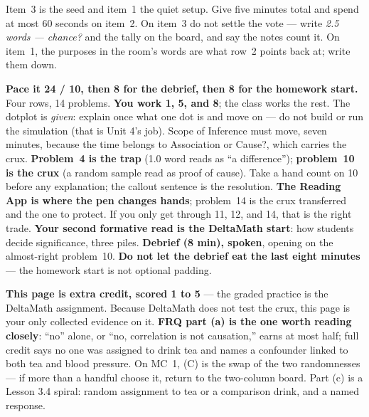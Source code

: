 \documentclass[10pt]{article}
\begin{document}
\begin{teachernote}[Warm-Up]
Item~3 is the seed and item~1 the quiet setup. Give five minutes total and spend at most 60
seconds on item~2. On item~3 do not settle the vote --- write \emph{2.5 words --- chance?} and
the tally on the board, and say the notes count it. On item~1, the purposes in the room's
words are what row~2 points back at; write them down.
\end{teachernote}

\begin{teachernote}
\textbf{Pace it 24 / 10, then 8 for the debrief, then 8 for the homework start.} Four rows, 14
problems. \textbf{You work 1, 5, and 8}; the class works the rest. The dotplot is
\emph{given}: explain once what one dot is and move on --- do not build or run the simulation
(that is Unit 4's job). Scope of Inference must move, seven minutes, because the time belongs
to Association or Cause?, which carries the crux. \textbf{Problem~4 is the trap} (1.0 word
reads as ``a difference''); \textbf{problem~10 is the crux} (a random sample read as proof of
cause). Take a hand count on 10 before any explanation; the callout sentence is the
resolution. \textbf{The Reading App is where the pen changes hands}; problem~14 is the crux
transferred and the one to protect. If you only get through 11, 12, and 14, that is the right
trade. \textbf{Your second formative read is the DeltaMath start}: how students decide significance, three piles.
\textbf{Debrief (8 min), spoken}, opening on the almost-right problem~10. \textbf{Do not let the
debrief eat the last eight minutes} --- the homework start is not optional padding.
\end{teachernote}

\begin{teachernote}[AP Practice]
\textbf{This page is extra credit, scored 1 to 5} --- the graded practice is the DeltaMath
assignment. Because DeltaMath does not test the crux, this page is your only collected evidence on it. \textbf{FRQ part (a) is the one worth reading closely}: ``no'' alone, or ``no,
correlation is not causation,'' earns at most half; full credit says no one was assigned to
drink tea and names a confounder linked to both tea and blood pressure. On MC~1, (C) is the
swap of the two randomnesses --- if more than a handful choose it, return to the two-column
board. Part (c) is a Lesson 3.4 spiral: random assignment to tea or a comparison drink, and a
named response.
\end{teachernote}
\end{document}
